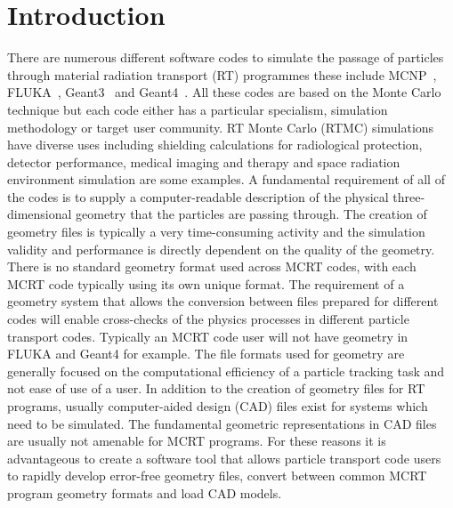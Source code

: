 \documentclass[final,5p,times,twocolumn]{elsarticle}
\begin{document}
\begin{small}

\end{small}

\section{Introduction} \label{sec:introduction}
There are numerous different software codes to simulate the passage of particles through material radiation transport (RT) programmes these 
include MCNP~\cite{Mcnp_Werner}, FLUKA~\cite{Fluka_Ferrari,Fluka_Bohlen}, Geant3~\cite{Geant3_Brun} and Geant4~\cite{Geant4_Agostinelli}. 
All these codes are based on the Monte Carlo technique but each code either has a particular specialism, simulation methodology or target user community.  
RT Monte Carlo (RTMC) simulations have diverse uses including shielding calculations for radiological protection, detector performance, medical imaging and therapy and space radiation environment  simulation are some examples. A fundamental requirement of all of the codes is to supply a computer-readable description of the 
physical three-dimensional geometry that  the particles are passing through.  The creation of geometry files is typically a very time-consuming 
activity and the simulation validity and performance is directly dependent on the quality of the geometry. There is no standard geometry format used across MCRT 
codes, with each MCRT code typically using its own unique format. The requirement of a geometry system that allows the conversion between files prepared for different 
codes will enable cross-checks of the physics processes in different particle transport codes. Typically an MCRT code user will not have geometry in FLUKA 
and Geant4 for example. The file formats used for geometry are generally focused on the computational efficiency of a particle tracking task and not ease of use of a user. In addition to the creation of geometry files for RT programs, usually computer-aided design (CAD) files exist for systems which 
need to be simulated. The fundamental geometric representations in CAD files are usually not amenable for MCRT programs.  For these reasons it is 
advantageous to create a software tool that allows particle transport code users to rapidly develop error-free geometry files, convert between common MCRT 
program geometry formats and load CAD models.
\end{document}
